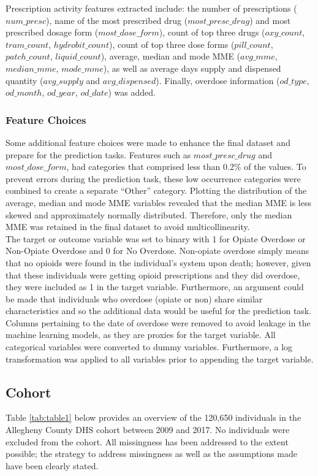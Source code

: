 \documentclass[twoside,10.5pt]{article}
\begin{document}
Prescription activity features extracted include: the number of prescriptions ($num\_presc$), name of the most prescribed drug ($most\_presc\_drug$) and most prescribed dosage form ($most\_dose\_form$), count of top three drugs ($oxy\_count$, $tram\_count$, $hydrobit\_count$), count of top three dose forms ($pill\_count$, $patch\_count$, $liquid\_count$), average, median and mode MME ($avg\_mme$, $median\_mme$, $mode\_mme$), as well as average days supply and dispensed quantity ($avg\_supply$ and $avg\_dispensed$). Finally, overdose information ($od\_type$, $od\_month$, $od\_year$, $od\_date$) was added. 

\subsubsection{Feature Choices}
Some additional feature choices were made to enhance the final dataset and prepare for the prediction tasks. Features such as $most\_presc\_drug$ and $most\_dose\_form$, had categories that comprised less than 0.2\% of the values. To prevent errors during the prediction task, these low occurrence categories were combined to create a separate “Other” category. Plotting the distribution of the average, median and mode MME variables revealed that the median MME is less skewed and approximately normally distributed. Therefore, only the median MME was retained in the final dataset to avoid multicollinearity.\\

The target or outcome variable was set to binary with 1 for Opiate Overdose or Non-Opiate Overdose and 0 for No Overdose. Non-opiate overdose simply means that no opioids were found in the individual's system upon death; however, given that these individuals were getting opioid prescriptions and they did overdose, they were included as 1 in the target variable. Furthermore, an argument could be made that individuals who overdose (opiate or non) share similar characteristics and so the additional data would be useful for the prediction task.\\ 

Columns pertaining to the date of overdose were removed to avoid leakage in the machine learning models, as they are proxies for the target variable. All categorical variables were converted to dummy variables. Furthermore, a log transformation was applied to all variables prior to appending the target variable. 

\subsection{Cohort}
Table \ref{tab:table1} below provides an overview of the 120,650 individuals in the Allegheny County DHS cohort between 2009 and 2017. No individuals were excluded from the cohort. All missingness has been addressed to the extent possible; the strategy to address missingness as well as the assumptions made have been clearly stated.
\end{document}
